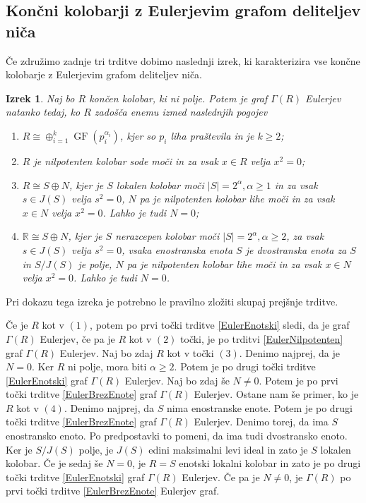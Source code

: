 \documentclass[a4paper, 12pt]{amsart}
\theoremstyle{definition} %
\theoremstyle{plain} %
\newtheorem{izrek}[definicija]{Izrek}
\newcommand{\R}{\mathbb R}
\DeclareMathOperator{\GF}{GF}
\begin{document}
\endproof


\subsection{Končni kolobarji z Eulerjevim grafom deliteljev niča}

Če združimo zadnje tri trditve dobimo naslednji izrek, ki karakterizira vse končne kolobarje z Eulerjevim grafom deliteljev niča.

\begin{izrek}
\label{EulerGraf}
Naj bo $R$ končen kolobar, ki ni polje. Potem je graf $\Gamma(R)$ Eulerjev natanko tedaj, ko $R$ zadošča enemu izmed naslednjih pogojev
\begin{enumerate}
\item $R \cong \oplus_{i=1}^k \GF(p_i^{\alpha_i})$, kjer so $p_i$ liha praštevila in je $k\ge 2$;
\item $R$ je nilpotenten kolobar sode moči in za vsak $x\in R$ velja $x^2 = 0$;
\item $R\cong S\oplus N$, kjer je $S$ lokalen kolobar moči $|S| = 2^{\alpha}, \alpha \ge 1$ in za vsak $s\in J(S)$ velja $s^2 = 0$, $N$ pa je nilpotenten kolobar lihe moči in za vsak $x\in N$ velja $x^2 = 0$. Lahko je tudi $N=0$;
\item $\R\cong S \oplus N$, kjer je $S$ nerazcepen kolobar moči $|S| = 2^{\alpha}, \alpha \ge 2$, za vsak $s\in J(S)$ velja $s^2 = 0$, vsaka enostranska enota $S$ je dvostranska enota za $S$ in $S/J(S)$ je polje, $N$ pa je nilpotenten kolobar lihe moči in za vsak $x\in N$ velja $x^2 = 0$. Lahko je tudi $N=0$.
\end{enumerate} 
\end{izrek}

\proof
Pri dokazu tega izreka je potrebno le pravilno zložiti skupaj prejšnje trditve. 

Če je $R$ kot v $(1)$, potem po prvi točki trditve \ref{EulerEnotski} sledi, da je graf $\Gamma(R)$ Eulerjev, če pa je $R$ kot v $(2)$ točki, je po trditvi \ref{EulerNilpotenten} graf $\Gamma(R)$ Eulerjev. Naj bo zdaj $R$ kot v točki $(3)$. Denimo najprej, da je $N=0$. Ker $R$ ni polje, mora biti $\alpha \ge 2$. Potem je po drugi točki trditve \ref{EulerEnotski} graf $\Gamma(R)$ Eulerjev. Naj bo zdaj še $N\neq 0$. Potem je po prvi točki trditve \ref{EulerBrezEnote} graf $\Gamma(R)$ Eulerjev. Ostane nam še primer, ko je $R$ kot v $(4)$. Denimo najprej, da $S$ nima enostranske enote. Potem je po drugi točki trditve \ref{EulerBrezEnote} graf $\Gamma(R)$ Eulerjev. Denimo torej, da ima $S$ enostransko enoto. Po predpostavki to pomeni, da ima tudi dvostransko enoto. Ker je $S/J(S)$ polje, je $J(S)$ edini maksimalni levi ideal in zato je $S$ lokalen kolobar. Če je sedaj še $N=0$, je $R=S$ enotski lokalni kolobar in zato je po drugi točki trditve \ref{EulerEnotski} graf $\Gamma(R)$ Eulerjev. Če pa je $N\neq 0$, je $\Gamma(R)$ po prvi točki trditve \ref{EulerBrezEnote} Eulerjev graf.
\end{document}
